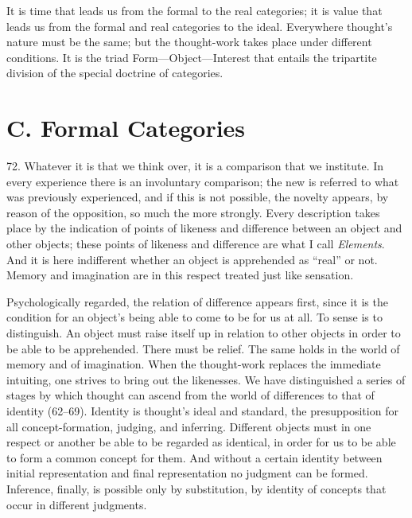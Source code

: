 \documentclass[12pt,a4paper]{book}
\newcommand{\opage}[1]{\marginnote{\footnotesize\textit{[#1]}}}
\begin{document}
It is time that leads us from the formal to the real categories; it is value
that leads us from the formal and real categories to the ideal. Everywhere
thought's nature must be the same; but the thought-work takes place under
different conditions. It is the triad Form---Object---Interest that entails
the tripartite division of the special doctrine of categories.

\section*{C. Formal Categories}
\label{sec:formale-kategorier}

72. Whatever it is that we think over, it is a comparison that we
institute. In every experience there is an involuntary comparison; the new
is referred to what was previously experienced, and if this is not possible,
the novelty appears, by reason of the opposition, so much the more strongly.
Every description takes place by the indication of points of likeness and
difference between an object and other objects; these points of likeness and
difference are what I call \emph{Elements}. And it is here indifferent
whether an object is apprehended as ``real'' or not. Memory and imagination
are in this respect treated just like sensation.

Psychologically regarded, the relation of difference appears first, since it
is the condition for an object's being able to come to be for us at all. To
sense is to distinguish. An object must raise itself up in relation to other
objects in order to be able to be apprehended. There must be relief. The
same holds in the world of memory and of imagination. When the thought-work
replaces the immediate intuiting, one strives to bring out the likenesses.
We have distinguished a series of stages by which thought can ascend from
the world of differences to that of identity (62--69). Identity is thought's
ideal and standard, the presupposition for all concept-formation, judging,
and inferring. Different objects must in one respect or another be able to be
regarded as identical, in order for us to be able to form a common concept
for them. And without a certain identity between initial representation and
final representation no judgment can be formed. Inference, finally, is
\opage{176}possible only by substitution, by identity of concepts that occur in
different judgments.
\end{document}
